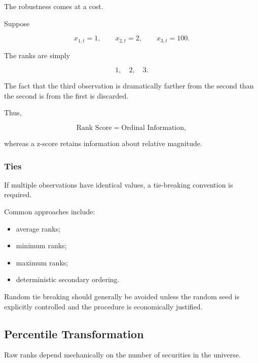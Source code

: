 \documentclass[11pt,a4paper]{article}
\begin{document}
The robustness comes at a cost.

Suppose

\begin{equation}
x_{1,t}=1,
\qquad
x_{2,t}=2,
\qquad
x_{3,t}=100.
\end{equation}

The ranks are simply

\begin{equation}
1,\quad2,\quad3.
\end{equation}

The fact that the third observation is dramatically farther from the second
than the second is from the first is discarded.

Thus,

\begin{equation}
\boxed{
\text{Rank Score}
=
\text{Ordinal Information},
}
\end{equation}

whereas a z-score retains information about relative magnitude.


\subsubsection{Ties}

If multiple observations have identical values, a tie-breaking convention is
required.

Common approaches include:

\begin{itemize}
    \item average ranks;
    \item minimum ranks;
    \item maximum ranks;
    \item deterministic secondary ordering.
\end{itemize}

Random tie breaking should generally be avoided unless the random seed is
explicitly controlled and the procedure is economically justified.


\subsection{Percentile Transformation}
\label{subsec:percentile_transformation}

Raw ranks depend mechanically on the number of securities in the universe.
\end{document}
